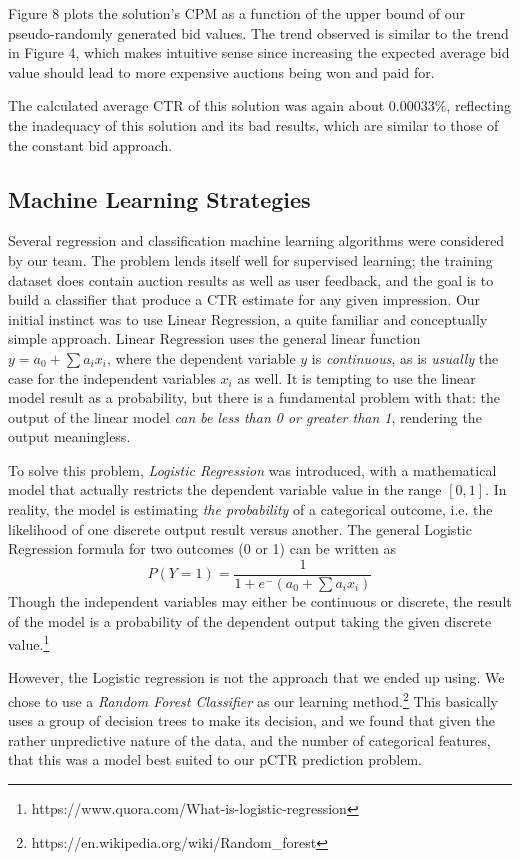 \documentclass{sig-alternate-05-2015}
\begin{document}
Figure 8 plots the solution's CPM as a function of the upper bound of our pseudo-randomly generated bid values. The trend observed is similar to the trend in Figure 4, which makes intuitive sense since increasing the expected average bid value should lead to more expensive auctions being won and paid for.

The calculated average CTR of this solution was again about $0.00033\%$, reflecting the inadequacy of this solution and its bad results, which are similar to those of the constant bid approach.

\subsection{Machine Learning Strategies}
Several regression and classification machine learning algorithms were considered by our team. The problem lends itself well for supervised learning; the training dataset does contain auction results as well as user feedback, and the goal is to build a classifier that produce a CTR estimate for any given impression. Our initial instinct was to use Linear Regression, a quite familiar and conceptually simple approach. Linear Regression uses the general linear function $y = a_0 +  \sum a_i x_i$, where the dependent variable $y$ is \textit{continuous}, as is \textit{usually} the case for the independent variables $x_i$ as well. It is tempting to use the linear model result as a probability, but there is a fundamental problem with that: the output of the linear model \textit{can be less than 0 or greater than 1}, rendering the output meaningless.

To solve this problem, \textit{Logistic Regression} was introduced, with a mathematical model that actually restricts the dependent variable value in the range $[0,1]$. In reality, the model is estimating \textit{the probability} of a categorical outcome, i.e. the likelihood of one discrete output result versus another. The general Logistic Regression formula for two outcomes (0 or 1) can be written as \[P(Y=1) = \frac{1}{1+e^-(a_0+\sum a_i x_i)}\]
Though the independent variables may either be continuous or discrete, the result of the model is a probability of the dependent output taking the given discrete value.\footnote{https://www.quora.com/What-is-logistic-regression}

However, the Logistic regression is not the approach that we ended up using. We chose to use a \textit{Random Forest Classifier} as our learning method.\footnote{https://en.wikipedia.org/wiki/Random\_forest} This basically uses a group of decision trees to make its decision, and we found that given the rather unpredictive nature of the data, and the number of categorical features, that this was a model best suited to our pCTR prediction problem.
\end{document}
